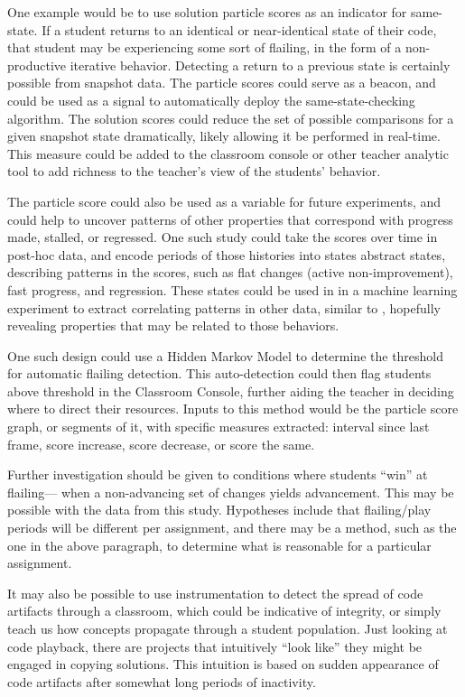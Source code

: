 One example would be to use solution particle scores as an indicator for same-state. If a student returns to an identical or near-identical state of their code, that student may be experiencing some sort of flailing, in the form of a non-productive iterative behavior. Detecting a return to a previous state is certainly possible from snapshot data. The particle scores could serve as a beacon, and could be used as a signal to automatically deploy the same-state-checking algorithm. The solution scores could reduce the set of possible comparisons for a given snapshot state dramatically, likely allowing it be performed in real-time. This measure could be added to the classroom console or other teacher analytic tool to add richness to the teacher's view of the students' behavior. 

The particle score could also be used as a variable for future experiments, and could help to uncover patterns of other properties that correspond with progress made, stalled, or regressed. One such study could take the scores over time in post-hoc data, and encode periods of those histories into states abstract states, describing patterns in the scores, such as flat changes (active non-improvement), fast progress, and regression. These states could be used in in a machine learning experiment to extract correlating patterns in other data, similar to \citet{tissenbaummodeling}, hopefully revealing properties that may be related to those behaviors.

One such design could use a Hidden Markov Model to determine the threshold for automatic flailing detection. This auto-detection could then flag students above threshold in the Classroom Console, further aiding the teacher in deciding where to direct their resources. Inputs to this method would be the particle score graph, or segments of it, with specific measures extracted: interval since last frame, score increase, score decrease, or score the same. 

Further investigation should be given to conditions where students ``win'' at flailing--- when a non-advancing set of changes yields advancement. This may be possible with the data from this study. Hypotheses include that flailing/play periods will be different per assignment, and there may be a method, such as the one in the above paragraph, to determine what is reasonable for a particular assignment. 

It may also be possible to use instrumentation to detect the spread of code artifacts through a classroom, which could be indicative of integrity, or simply teach us how concepts propagate through a student population. Just looking at code playback, there are projects that intuitively ``look like'' they might be engaged in copying solutions. This intuition is based on sudden appearance of code artifacts after somewhat long periods of inactivity. 

